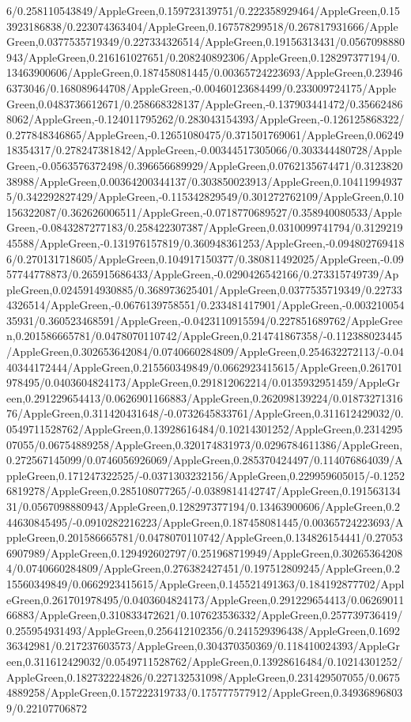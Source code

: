 {\begin{tikzternal}
{6/0.258110543849/AppleGreen,0.159723139751/0.222358929464/AppleGreen,0.153923186838/0.223074363404/AppleGreen,0.167578299518/0.267817931666/AppleGreen,0.0377535719349/0.227334326514/AppleGreen,0.19156313431/0.0567098880943/AppleGreen,0.216161027651/0.208240892306/AppleGreen,0.128297377194/0.13463900606/AppleGreen,0.187458081445/0.00365724223693/AppleGreen,0.239466373046/0.168089644708/AppleGreen,-0.00460123684499/0.233009724175/AppleGreen,0.0483736612671/0.258668328137/AppleGreen,-0.137903441472/0.356624868062/AppleGreen,-0.124011795262/0.283043154393/AppleGreen,-0.126125868322/0.277848346865/AppleGreen,-0.12651080475/0.371501769061/AppleGreen,0.0624918354317/0.278247381842/AppleGreen,-0.00344517305066/0.303344480728/AppleGreen,-0.0563576372498/0.396656689929/AppleGreen,0.0762135674471/0.312382038988/AppleGreen,0.00364200344137/0.303850023913/AppleGreen,0.104119949375/0.342292827429/AppleGreen,-0.115342829549/0.301272762109/AppleGreen,0.10156322087/0.362626006511/AppleGreen,-0.0718770689527/0.358940080533/AppleGreen,-0.0843287277183/0.258422307387/AppleGreen,0.0310099741794/0.312921945588/AppleGreen,-0.131976157819/0.360948361253/AppleGreen,-0.0948027694186/0.270131718605/AppleGreen,0.104917150377/0.380811492025/AppleGreen,-0.0957744778873/0.265915686433/AppleGreen,-0.0290426542166/0.273315749739/AppleGreen,0.0245914930885/0.368973625401/AppleGreen,0.0377535719349/0.227334326514/AppleGreen,-0.0676139758551/0.233481417901/AppleGreen,-0.00321005435931/0.360523468591/AppleGreen,-0.0423110915594/0.227851689762/AppleGreen,0.201586665781/0.0478070110742/AppleGreen,0.214741867358/-0.112388023445/AppleGreen,0.302653642084/0.0740660284809/AppleGreen,0.254632272113/-0.0440344172444/AppleGreen,0.215560349849/0.0662923415615/AppleGreen,0.261701978495/0.0403604824173/AppleGreen,0.291812062214/0.0135932951459/AppleGreen,0.291229654413/0.0626901166883/AppleGreen,0.262098139224/0.0187327131676/AppleGreen,0.311420431648/-0.0732645833761/AppleGreen,0.311612429032/0.0549711528762/AppleGreen,0.13928616484/0.10214301252/AppleGreen,0.231429507055/0.06754889258/AppleGreen,0.320174831973/0.0296784611386/AppleGreen,0.272567145099/0.0746056926069/AppleGreen,0.285370424497/0.114076864039/AppleGreen,0.171247322525/-0.0371303232156/AppleGreen,0.229959605015/-0.12526819278/AppleGreen,0.285108077265/-0.0389814142747/AppleGreen,0.19156313431/0.0567098880943/AppleGreen,0.128297377194/0.13463900606/AppleGreen,0.244630845495/-0.0910282216223/AppleGreen,0.187458081445/0.00365724223693/AppleGreen,0.201586665781/0.0478070110742/AppleGreen,0.134826154441/0.270536907989/AppleGreen,0.129492602797/0.251968719949/AppleGreen,0.302653642084/0.0740660284809/AppleGreen,0.276382427451/0.197512809245/AppleGreen,0.215560349849/0.0662923415615/AppleGreen,0.145521491363/0.184192877702/AppleGreen,0.261701978495/0.0403604824173/AppleGreen,0.291229654413/0.0626901166883/AppleGreen,0.310833472621/0.107623536332/AppleGreen,0.257739736419/0.255954931493/AppleGreen,0.256412102356/0.241529396438/AppleGreen,0.169236342981/0.217237603573/AppleGreen,0.304370350369/0.118410024393/AppleGreen,0.311612429032/0.0549711528762/AppleGreen,0.13928616484/0.10214301252/AppleGreen,0.182732224826/0.227132531098/AppleGreen,0.231429507055/0.06754889258/AppleGreen,0.157222319733/0.175777577912/AppleGreen,0.349368968039/0.22107706872}
\end{tikzternal}}
